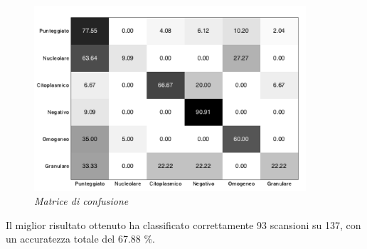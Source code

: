 \begin{figure}[H] 
  \centering
    \includegraphics[width=0.9\textwidth]{images/confusion_matrix.png}
    \caption{{\small \textit{Matrice di confusione}}}
\end{figure}

Il miglior risultato ottenuto ha classificato correttamente 93 scansioni su 137, con un accuratezza totale del 67.88 \%.

